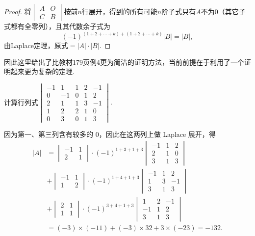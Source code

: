 \begin{proof}
    将$\begin{vmatrix}
            A & O \\
            C & B
        \end{vmatrix}$按前$n$行展开，得到的所有可能$n$阶子式只有$A$不为0（其它子式都有全零列），且其代数余子式为
    \[(-1)^{(1+2+\cdots+k)+(1+2+\cdots+k)}|B|=|B|,\]
    由Laplace定理，原式$=|A|\cdot|B|$.
\end{proof}

因此这里给出了比教材179页例4更为简洁的证明方法，当前前提在于利用了一个证明起来更为复杂的定理.

\begin{example}{}{}
    计算行列式$\begin{vmatrix}
        -1 & 1 & 1 & 2 & -1 \\
        0 & -1 & 0 & 1 & 2 \\
        2 & 1 & 1 & 3 & -1 \\
        1 & 2 & 2 & 1 & 0 \\
        0 & 3 & 0 & 1 & 3
    \end{vmatrix}.$
\end{example}

\begin{solution}
    因为第一、第三列含有较多的 $0$，因此在这两列上做 Laplace 展开，得
    \begin{align*}
        |A| &= \begin{vmatrix}
            -1 & 1 \\ 2 & 1
        \end{vmatrix} \cdot (-1)^{1+3+1+3} \begin{vmatrix}
            -1 & 1 & 2 \\ 2 & 1 & 0 \\ 3 & 1 & 3
        \end{vmatrix} \\
        &+ \begin{vmatrix}
            -1 & 1 \\ 1 & 2
        \end{vmatrix} \cdot (-1)^{1+4+1+3} \begin{vmatrix}
            -1 & 1 & 2 \\ 1 & 3 & -1 \\ 3 & 1 & 3
        \end{vmatrix} \\
        &+ \begin{vmatrix}
            2 & 1 \\ 1 & 1
        \end{vmatrix} \cdot (-1)^{3+4+1+3} \begin{vmatrix}
            1 & 2 & -1 \\ -1 & 1 & 2 \\ 3 & 1 & 3
        \end{vmatrix} \\
        &= (-3) \times (-11) + (-3) \times 32 + 3 \times (-23) = -132.
    \end{align*}
\end{solution}

